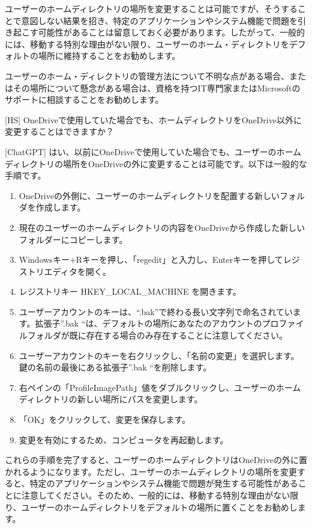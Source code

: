 \documentclass[
]{bxjsbook}
\theoremstyle{definition}
\theoremstyle{definition}
\theoremstyle{definition}
\theoremstyle{definition}
\theoremstyle{remark}
\begin{document}
ユーザーのホームディレクトリの場所を変更することは可能ですが、そうすることで意図しない結果を招き、特定のアプリケーションやシステム機能で問題を引き起こす可能性があることは留意しておく必要があります。したがって、一般的には、移動する特別な理由がない限り、ユーザーのホーム・ディレクトリをデフォルトの場所に維持することをお勧めします。

ユーザーのホーム・ディレクトリの管理方法について不明な点がある場合、またはその場所について懸念がある場合は、資格を持つIT専門家またはMicrosoftのサポートに相談することをお勧めします。

{[}HS{]} OneDriveで使用していた場合でも、ホームディレクトリをOneDrive以外に変更することはできますか？

{[}ChatGPT{]} はい、以前にOneDriveで使用していた場合でも、ユーザーのホームディレクトリの場所をOneDriveの外に変更することは可能です。以下は一般的な手順です。

\begin{enumerate}
\def\labelenumi{\arabic{enumi}.}
\item
  OneDriveの外側に、ユーザーのホームディレクトリを配置する新しいフォルダを作成します。
\item
  現在のユーザーのホームディレクトリの内容をOneDriveから作成した新しいフォルダーにコピーします。
\item
  Windowsキー+Rキーを押し、「regedit」と入力し、Enterキーを押してレジストリエディタを開く。
\item
  レジストリキー HKEY\_LOCAL\_MACHINE を開きます。
\item
  ユーザーアカウントのキーは、``.bak''で終わる長い文字列で命名されています。拡張子''.bak ``は、デフォルトの場所にあなたのアカウントのプロファイルフォルダが既に存在する場合のみ存在することに注意してください。
\item
  ユーザーアカウントのキーを右クリックし、「名前の変更」を選択します。鍵の名前の最後にある拡張子''.bak ``を削除します。
\item
  右ペインの「ProfileImagePath」値をダブルクリックし、ユーザーのホームディレクトリの新しい場所にパスを変更します。
\item
  「OK」をクリックして、変更を保存します。
\item
  変更を有効にするため、コンピュータを再起動します。
\end{enumerate}

これらの手順を完了すると、ユーザーのホームディレクトリはOneDriveの外に置かれるようになります。ただし、ユーザーのホームディレクトリの場所を変更すると、特定のアプリケーションやシステム機能で問題が発生する可能性があることに注意してください。そのため、一般的には、移動する特別な理由がない限り、ユーザーのホームディレクトリをデフォルトの場所に置くことをお勧めします。
\end{document}
